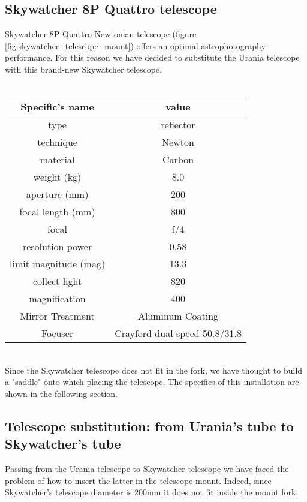 \subsection{Skywatcher 8P Quattro telescope}
Skywatcher 8P Quattro Newtonian telescope (figure \ref{fig:skywatcher_telescope_mount}) offers an optimal astrophotography performance.
For this reason we have decided to substitute the Urania telescope with this brand-new Skywatcher telescope.
\\
\\
\begin{minipage}{0.5\textwidth}
    \centering
    \begin{tabular}{c|c}
        \hline
        \textbf{Specific's name} & \textbf{value} \\
        \hline
        type & reflector \\
        technique & Newton  \\
        material & Carbon  \\
        weight (kg) & 8.0 \\
        aperture (mm) & 200 \\
        focal length (mm) & 800 \\
        focal & f/4 \\
        resolution power & 0.58 \\
        limit magnitude (mag) & 13.3 \\
        collect light & 820 \\
        magnification & 400 \\
        Mirror Treatment & Aluminum Coating \\
        Focuser & Crayford dual-speed 50.8/31.8 \\
        \hline
    \end{tabular}
    \label{tab_skywatcher_quattro}
\end{minipage}
\\
Since the Skywatcher telescope does not fit in the fork, we have thought to build a "saddle" onto which placing the telescope.
The specifics of this installation are shown in the following section.

\subsection{Telescope substitution: from Urania's tube to Skywatcher's tube}
Passing from the Urania telescope to Skywatcher telescope we have faced the problem of how to insert the latter in the telescope mount.
Indeed, since Skywatcher's telescope diameter is 200mm it does not fit inside the mount fork.

